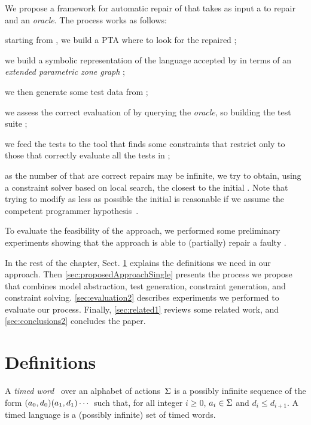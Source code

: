 \begin{tikzborder}{\cite{Gargantini16:validation}}
\begin{tikzborder}{\cite{gargantini_combinatorial_2017}}
\begin{tikzborder}{\cite{garn2019}}
\begin{tikzborder}{\cite{arcaini2019achieving}}
\begin{tikzborder}{\cite{arcaini2019varivolution}}
We propose a framework for automatic repair of \tas that takes as input a \ta \initTa to repair and an {\it oracle}. The process works as follows:
%
\begin{ienumeration}
	\item starting from \initTa, we build a PTA \ptaProc where to look for the repaired \ta;
	\item we build a symbolic representation of the language accepted by \ptaProc in terms of an {\it extended parametric zone graph} \epzg;
	\item we then generate some test data \testData from \epzg;
	\item we assess the correct evaluation of \testData by querying the {\it oracle}, so building the test suite \testSuiteTA;
	\item we feed the tests \testSuiteTA to the \imitator tool that finds some constraints \ptaConstr that restrict \ptaProc only to those \tas that correctly evaluate all the tests in \testSuiteTA;
	\item as the number of \tas that are correct repairs may be infinite, we try to obtain, using a constraint solver based on local search, the \ta \repTa closest to the initial \ta \initTa. Note that trying to modify as less as possible the initial \ta is reasonable if we assume the competent programmer hypothesis~\cite{surveyMutationTestingPapadakis2018}.
\end{ienumeration}

To evaluate the feasibility of the approach, we performed some preliminary experiments showing that the approach is able to (partially) repair a faulty \ta. 

In the rest of the chapter, Sect. 
\ref{sec:definitions1} explains the definitions we need in our approach.
Then \ref{sec:proposedApproachSingle} presents the process we propose that combines model abstraction, test generation, constraint generation, and constraint solving.
\ref{sec:evaluation2} describes experiments we performed to evaluate our process.
Finally, \ref{sec:related1} reviews some related work, and \ref{sec:conclusions2} concludes the paper.

\section{Definitions}\label{sec:definitions1}

\begin{tikzborder}{\cite{andre_tap_2019}}
A \emph{timed word}~\cite{AD94} over an alphabet of actions~$\Sigma$ is a possibly infinite sequence of the form
$(a_0 , d_0) (a_1, d_1) \cdots$
such that, for all integer $i \geq 0$, $a_i \in \Sigma$ and $d_i \leq d_{i+1}$.
A timed language is a (possibly infinite) set of timed words.


\end{tikzborder}
\end{tikzborder}
\end{tikzborder}
\end{tikzborder}
\end{tikzborder}
\end{tikzborder}
